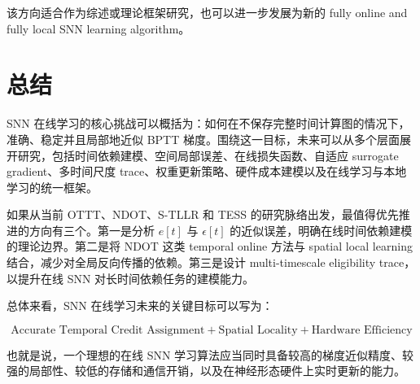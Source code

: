 \documentclass[11pt]{ctexart}
\begin{document}
该方向适合作为综述或理论框架研究，也可以进一步发展为新的 fully online and fully local SNN learning algorithm。

\section{总结}

SNN 在线学习的核心挑战可以概括为：如何在不保存完整时间计算图的情况下，准确、稳定并且局部地近似 BPTT 梯度。围绕这一目标，未来可以从多个层面展开研究，包括时间依赖建模、空间局部误差、在线损失函数、自适应 surrogate gradient、多时间尺度 trace、权重更新策略、硬件成本建模以及在线学习与本地学习的统一框架。

如果从当前 OTTT、NDOT、S-TLLR 和 TESS 的研究脉络出发，最值得优先推进的方向有三个。第一是分析 $e[t]$ 与 $\epsilon[t]$ 的近似误差，明确在线时间依赖建模的理论边界。第二是将 NDOT 这类 temporal online 方法与 spatial local learning 结合，减少对全局反向传播的依赖。第三是设计 multi-timescale eligibility trace，以提升在线 SNN 对长时间依赖任务的建模能力。

总体来看，SNN 在线学习未来的关键目标可以写为：

\begin{equation}
\boxed{
\text{Accurate Temporal Credit Assignment}
+
\text{Spatial Locality}
+
\text{Hardware Efficiency}
}
\end{equation}

也就是说，一个理想的在线 SNN 学习算法应当同时具备较高的梯度近似精度、较强的局部性、较低的存储和通信开销，以及在神经形态硬件上实时更新的能力。
\end{document}
